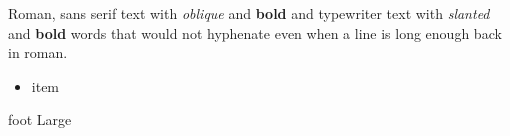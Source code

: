 \documentclass[11pt]{article}
\begin{document}
Roman, {\sffamily sans serif text with {\itshape oblique} and {\bfseries bold}} and {\ttfamily typewriter text with {\slshape slanted} and {\bfseries bold} words that would not hyphenate even when a line is long enough} back in roman.
\begin{itemize}
\item {\sffamily\small item}
\end{itemize}
{\ttfamily\footnotesize foot} {\sffamily\Large Large}
\end{document}
